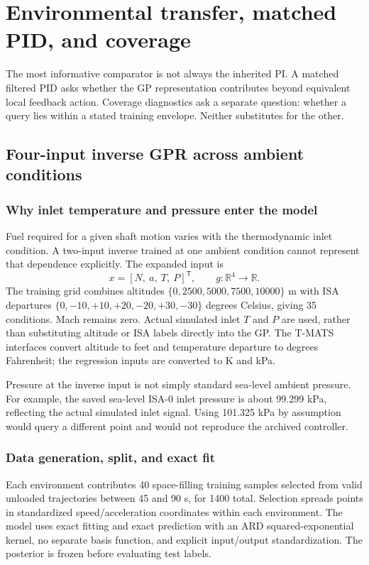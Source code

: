 \chapter{Environmental transfer, matched PID, and coverage}
\label{ch:environment}
The most informative comparator is not always the inherited PI. A matched filtered PID asks whether the GP representation contributes beyond equivalent local feedback action. Coverage diagnostics ask a separate question: whether a query lies within a stated training envelope. Neither substitutes for the other.

\section{Four-input inverse GPR across ambient conditions}
\subsection{Why inlet temperature and pressure enter the model}
Fuel required for a given shaft motion varies with the thermodynamic inlet condition. A two-input inverse trained at one ambient condition cannot represent that dependence explicitly. The expanded input is
\begin{equation}
x=[N,\ a,\ T,\ P]^\mathsf T,\qquad g:\mathbb R^4\rightarrow\mathbb R.
\end{equation}
The training grid combines altitudes $\{0,2500,5000,7500,10000\}$ m with ISA departures $\{0,-10,+10,+20,-20,+30,-30\}$ degrees Celsius, giving 35 conditions. Mach remains zero. Actual simulated inlet $T$ and $P$ are used, rather than substituting altitude or ISA labels directly into the GP. The T-MATS interfaces convert altitude to feet and temperature departure to degrees Fahrenheit; the regression inputs are converted to K and kPa.

Pressure at the inverse input is not simply standard sea-level ambient pressure. For example, the saved sea-level ISA-0 inlet pressure is about 99.299 kPa, reflecting the actual simulated inlet signal. Using 101.325 kPa by assumption would query a different point and would not reproduce the archived controller.

\subsection{Data generation, split, and exact fit}
Each environment contributes 40 space-filling training samples selected from valid unloaded trajectories between 45 and 90 s, for 1400 total. Selection spreads points in standardized speed/acceleration coordinates within each environment. The model uses exact fitting and exact prediction with an ARD squared-exponential kernel, no separate basis function, and explicit input/output standardization. The posterior is frozen before evaluating test labels.

